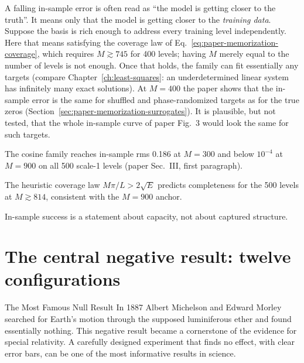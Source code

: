 \begin{pitfall}
A falling in-sample error is often read as ``the model is getting closer to the truth''. It means only that the model is getting closer to the \emph{training data}. Suppose the basis is rich enough to address every training level independently. Here that means satisfying the coverage law of Eq.~\eqref{eq:paper-memorization-coverage}, which requires $M\gtrsim745$ for 400 levels; having $M$ merely equal to the number of levels is not enough. Once that holds, the family can fit essentially any targets (compare Chapter~\ref{ch:least-squares}: an underdetermined linear system has infinitely many exact solutions). At $M=400$ the paper shows that the in-sample error is the same for shuffled and phase-randomized targets as for the true zeros (Section~\ref{sec:paper-memorization-surrogates}). It is plausible, but not tested, that the whole in-sample curve of paper Fig.~3 would look the same for such targets.
\end{pitfall}

\begin{keyideas}
\item The cosine family reaches in-sample rms 0.186 at $M=300$ and below $10^{-4}$ at $M=900$ on all 500 scale-1 levels (paper Sec.~III, first paragraph).
\item The heuristic coverage law $M\pi/L>2\sqrt E$ predicts completeness for the 500 levels at $M\gtrsim814$, consistent with the $M=900$ anchor.
\item In-sample success is a statement about capacity, not about captured structure.
\end{keyideas}

\section{The central negative result: twelve configurations}\label{sec:paper-memorization-tableI}
\begin{didyouknow}{The Most Famous Null Result}
In 1887 Albert Michelson and Edward Morley searched for Earth's motion through the supposed luminiferous ether and found essentially nothing. This negative result became a cornerstone of the evidence for special relativity. A carefully designed experiment that finds no effect, with clear error bars, can be one of the most informative results in science.
\end{didyouknow}


